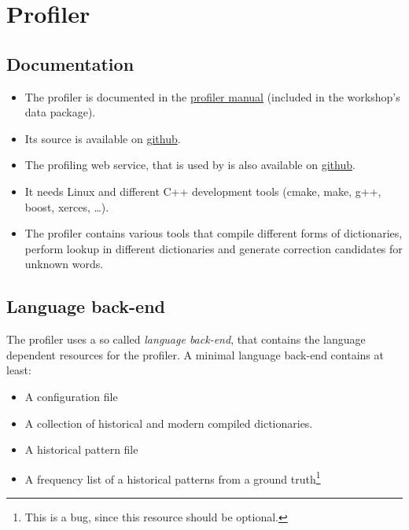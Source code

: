 \section{Profiler}
\subsection{Documentation}
\begin{frame}
	\begin{itemize}
		\item The profiler is documented in the
			\href{https://github.com/cisocrgroup/Resources/blob/master/manuals/profiler-manual.pdf}{profiler
			manual} (included in the workshop's data package).
		\item Its source is available on \href{https://github.com/cisocrgroup/Profiler}{github}.
		\item The profiling web service, that is used by \pocoto{} is also available
			on \href{https://github.com/cisocrgroup/ProfilerWebService}{github}.
		\item It needs Linux and different C++ development tools (cmake, make, g++,
			boost, xerces, \dots).
		\item The profiler contains various tools that compile different forms of
			dictionaries, perform lookup in different dictionaries and generate
			correction candidates for unknown words.
	\end{itemize}
\end{frame}

\subsection{Language back-end}
\begin{frame}
	The profiler uses a so called \emph{language back-end}, that contains the
	language dependent resources for the profiler. A minimal language back-end
	contains at least:
	\begin{itemize}
		\item A configuration file
		\item A collection of historical and modern compiled dictionaries.
		\item A historical pattern file
		\item A frequency list of a historical patterns from a ground
			truth\footnote{This is a bug, since this resource should be optional.}
	\end{itemize}
\end{frame}

